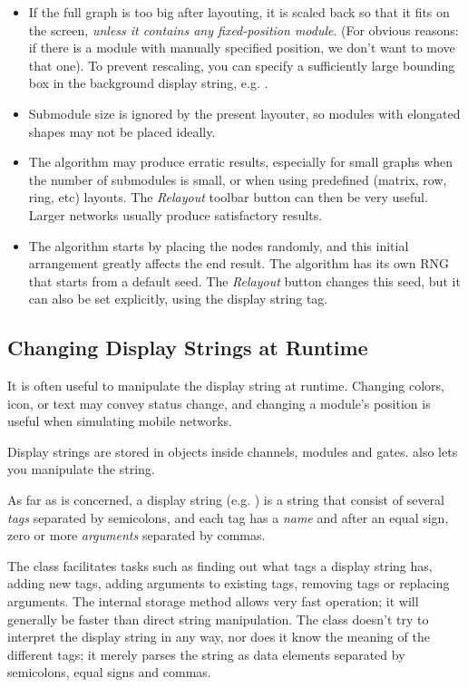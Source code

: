 \begin{itemize}
  \item If the full graph is too big after layouting, it is scaled
    back so that it fits on the screen, \textit{unless it contains
    any fixed-position module}. (For obvious reasons: if there is a module
    with manually specified position, we don't want to move that one).
    To prevent rescaling, you can specify a sufficiently large bounding
    box in the background display string, e.g. .
  \item Submodule size is ignored by the present layouter, so modules
    with elongated shapes may not be placed ideally.
  \item The algorithm may produce erratic results, especially for small graphs
    when the number of submodules is small, or when using predefined
    (matrix, row, ring, etc) layouts. The \textit{Relayout} toolbar button
    can then be very useful. Larger networks usually produce
    satisfactory results.
  \item The algorithm starts by placing the nodes randomly, and this initial
    arrangement greatly affects the end result. The algorithm has its
    own RNG that starts from a default seed. The \textit{Relayout} button
    changes this seed, but it can also be set explicitly, using the
     display string tag.
\end{itemize}


\subsection{Changing Display Strings at Runtime}

It is often useful to manipulate the display string at runtime.
Changing colors, icon, or text may convey status change, and
changing a module's position is useful when simulating mobile
networks.

Display strings are stored in  objects inside
channels, modules and gates.  also lets you
manipulate the string.

As far as  is concerned, a display string
(e.g. ) is a string that consist of several
\textit{tags} separated by semicolons, and each tag has a \textit{name}
and after an equal sign, zero or more \textit{arguments} separated by commas.

The class facilitates tasks such as finding out what tags a display string
has, adding new tags, adding arguments to existing tags, removing tags or
replacing arguments. The internal storage method allows very fast
operation; it will generally be faster than direct string manipulation. The
class doesn't try to interpret the display string in any way, nor does it
know the meaning of the different tags; it merely parses the string as data
elements separated by semicolons, equal signs and commas.

